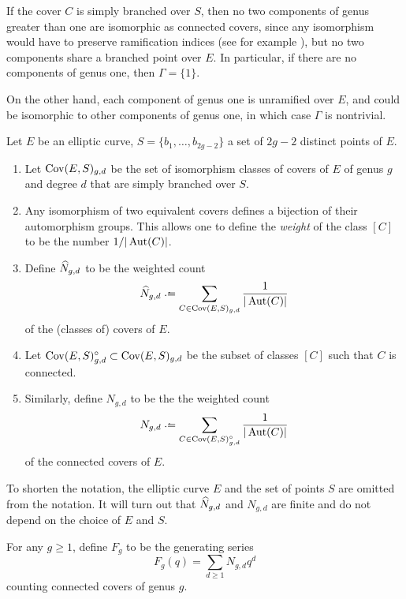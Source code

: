 \begin{rmk}
 If the cover $C$ is simply branched over $S$, then no two components of genus greater than one are isomorphic as connected covers, since any isomorphism would have to preserve ramification indices (see for example \cite[II, Prop. 2.6]{Silverman2009}), but no two components share a branched point over $E$. In particular, if there are no components of genus one, then $\Gamma=\{1\}$.
 
 On the other hand, each component of genus one is unramified over $E$, and could be isomorphic to other components of genus one, in which case $\Gamma$ is nontrivial.
\end{rmk}
\begin{defi} Let $E$ be an elliptic curve, $S=\{b_1,\dotsc,b_{2g-2}\}$ a set of $2g-2$ distinct points of $E$.
 \begin{enumerate}
  \item Let $\operatorname{Cov}(E,S)_{g,d}$ be the set of isomorphism classes of covers of $E$ of genus $g$ and degree $d$ that are simply branched over $S$.
  
  \item Any isomorphism of two equivalent covers defines a bijection of their automorphism groups. This allows one to define the \emph{weight} of the class $[C]$ to be the number $1/|\operatorname{Aut}(C)|$.
  
  \item Define $\widehat{N}_{g,d}$ to be the weighted count \[\what N_{g,d}\defeq\sum_{C\in \Cov(E,S)_{g,d}} \frac{1}{|\Aut(C)|}\] of the (classes of) covers of $E$.
  
  \item Let $\operatorname{Cov}(E,S)^{\circ}_{g,d}\subset\operatorname{Cov}(E,S)_{g,d}$ be the subset of classes $[C]$ such that $C$ is connected.
  
  \item Similarly, define $N_{g,d}$ to be the the weighted count \[N_{g,d}\defeq\sum_{C\in \Cov(E,S)^{\circ}_{g,d}} \frac{1}{|\Aut(C)|}\] of the connected covers of $E$.
 \end{enumerate}
 To shorten the notation, the elliptic curve $E$ and the set of points $S$ are omitted from the notation. It will turn out that $\widehat{N}_{g,d}$ and $N_{g,d}$ are finite and do not depend on the choice of $E$ and $S$.
\end{defi}

\begin{defi}
 For any $g\geq 1$, define $F_g$ to be the generating series \[F_g(q)=\sum_{d\geq 1}N_{g,d}q^d\] counting connected covers of genus $g$.
\end{defi}

